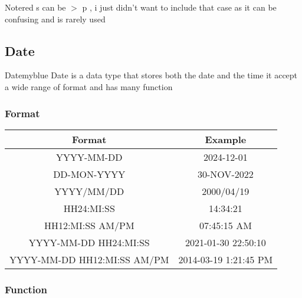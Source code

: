 \begin{prettyBox}{Note}{red}
s can be \(>\) p , i just didn't want to include that case as it can be confusing and is rarely used
\end{prettyBox}


\vspace{0.5cm}

\subsection{Date}

\begin{prettyBox}{Date}{myblue}
Date is a data type that stores both the date and the time it accept a wide range of format
and has many function  
\end{prettyBox}

\vspace{0.25cm}

\subsubsection{Format}

\vspace{0.25cm}
\begin{center}
 \renewcommand{\arraystretch}{1.5}
    \begin{tabular}{|c|c|}
        \hline
        Format & Example\\
        \hline
        YYYY-MM-DD & 2024-12-01 \\
        \hline
        DD-MON-YYYY & 30-NOV-2022\\
        \hline
        YYYY/MM/DD & 2000/04/19\\
        \hline
        HH24:MI:SS & 14:34:21\\
        \hline
        HH12:MI:SS AM/PM & 07:45:15 AM\\
        \hline
        YYYY-MM-DD HH24:MI:SS & 2021-01-30 22:50:10\\
        \hline 
        YYYY-MM-DD HH12:MI:SS AM/PM & 2014-03-19 1:21:45 PM\\
        \hline
    \end{tabular}
\end{center}


\vspace{0.5cm}
\subsubsection{Function}

